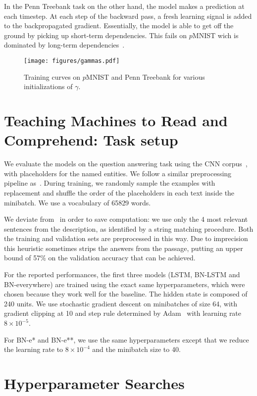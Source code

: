 \documentclass{article} \pdfoutput=1 \usepackage[utf8]{inputenc}
\begin{document}
In the Penn Treebank task on the other hand, the model makes a prediction at each timestep.
At each step of the backward pass, a fresh learning signal is added to the backpropagated gradient.
Essentially, the model is able to get off the ground by picking up short-term dependencies.
This fails on $p$MNIST wich is dominated by long-term dependencies~\citep{urnn}.

\begin{figure}[!h]
\center
\texttt{[image: figures/gammas.pdf]}
\caption{Training curves on $p$MNIST and Penn Treebank for various initializations of $\gamma$.}
\label{fig:gammas}
\end{figure}

\section{Teaching Machines to Read and Comprehend: Task setup} \label{sec:more-attr}

We evaluate the models on the question answering task using the CNN corpus~\citep{attentivereader},
with placeholders for the named entities. We follow a similar preprocessing
pipeline as~\citet{attentivereader}.  During training, we randomly sample the
examples with replacement and shuffle the order of the placeholders in each
text inside the minibatch.  We use a vocabulary of 65829 words.

We deviate from~\citet{attentivereader} in order to save computation:
we use only the 4 most relevant sentences from the description,
as identified by a string matching procedure.
Both the training and validation sets are preprocessed in this way.
Due to imprecision this heuristic sometimes strips the answers from the passage,
putting an upper bound of 57\% on the validation accuracy that can be achieved.

For the reported performances, the first three models (LSTM, BN-LSTM and BN-everywhere) are trained using the
exact same hyperparameters, which were chosen because they work well for the
baseline.  The hidden state is composed of 240 units.  We use stochastic
gradient descent on minibatches of size 64, with gradient clipping at 10 and
step rule determined by Adam~\citep{kingma2014adam} with learning rate $8
\times 10^{-5}$.

For BN-e* and BN-e**, we use the same hyperparameters except that we reduce the
learning rate to $8 \times 10^{-4}$ and the minibatch size to 40.

\section{Hyperparameter Searches}
\end{document}
